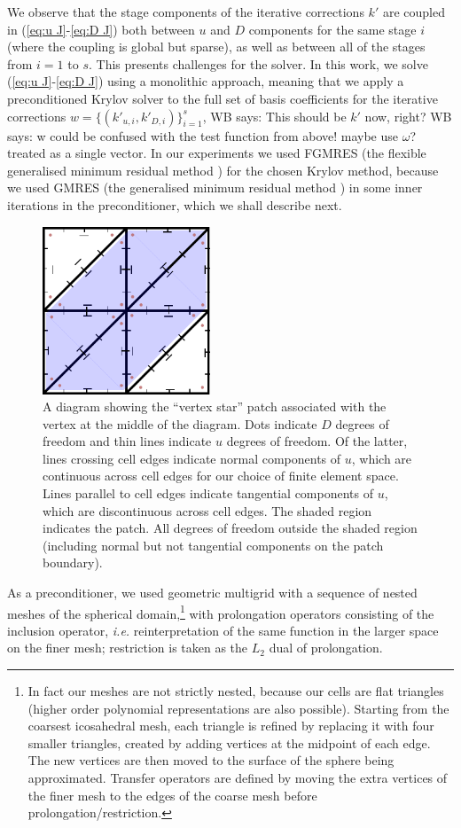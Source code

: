 \documentclass[a4paper, 12pt]{article}
\newcommand{\werner}[1]{{\color{magenta}WB says: #1}}
\begin{document}
We observe that the stage components of the iterative corrections $k'$
are coupled in (\ref{eq:u J}-\ref{eq:D J}) both between $u$ and $D$
components for the same stage $i$ (where the coupling is global but
sparse), as well as between all of the stages from $i=1$ to $s$. This
presents challenges for the solver. In this work, we solve (\ref{eq:u
  J}-\ref{eq:D J}) using a monolithic approach, meaning that we apply
a preconditioned Krylov solver to the full set of basis coefficients
for the iterative corrections $w=\{(k'_{u,i}, k'_{D,i})\}_{i=1}^s$,
\werner{This should be $k'$ now, right?}
\werner{w could be confused with the test function from above! maybe use $\omega$?}
treated as a single vector. In our experiments we used FGMRES (the
flexible generalised minimum residual method \citep{saad1993flexible})
for the chosen Krylov method, because we used GMRES (the generalised
minimum residual method \citep{saad1986gmres}) in some inner
iterations in the preconditioner, which we shall describe next.

\begin{figure}
  \center
  \includegraphics[width=5cm]{Images/patch}
  \caption{\label{fig:patch} A diagram showing the ``vertex
    star'' patch associated with the vertex at the middle of the
    diagram. Dots indicate $D$ degrees of freedom and thin lines
    indicate $u$ degrees of freedom. Of the latter, lines crossing
    cell edges indicate normal components of $u$, which are continuous
    across cell edges for our choice of finite element space.  Lines
    parallel to cell edges indicate tangential components of $u$,
    which are discontinuous across cell edges.  The shaded region
    indicates the patch.  All degrees of freedom outside the shaded
    region (including normal but not tangential components on the
    patch boundary).
  }
 \end{figure}



As a preconditioner, we used geometric multigrid with a sequence of
nested meshes of the spherical domain,\footnote{In fact our meshes are
not strictly nested, because our cells are flat triangles (higher
order polynomial representations are also possible). Starting from the
coarsest icosahedral mesh, each triangle is refined by replacing it
with four smaller triangles, created by adding vertices at the
midpoint of each edge. The new vertices are then moved to the surface
of the sphere being approximated. Transfer operators are defined by
moving the extra vertices of the finer mesh to the edges of the coarse
mesh before prolongation/restriction.} with prolongation operators
consisting of the inclusion operator, \emph{i.e.} reinterpretation of
the same function in the larger space on the finer mesh; restriction
is taken as the $L_2$ dual of prolongation.
\end{document}
